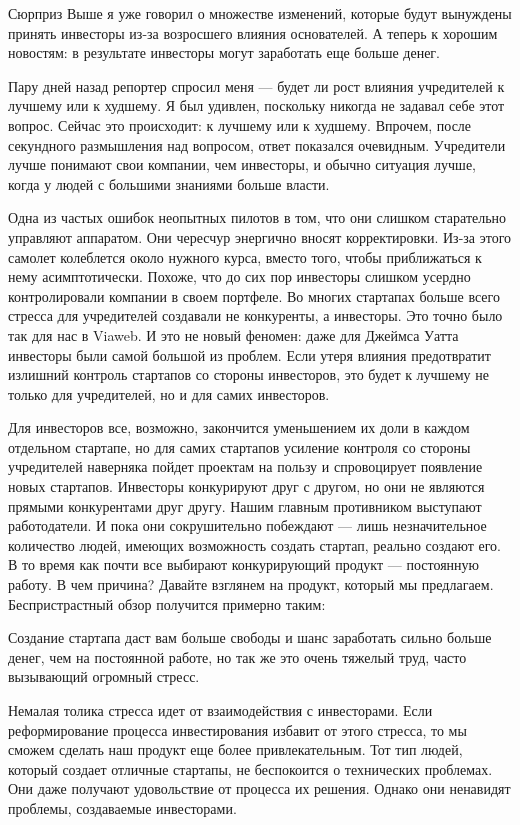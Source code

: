 \documentclass[ebook,12pt,oneside,openany]{memoir}
\begin{document}
Сюрприз Выше я уже говорил о множестве изменений, которые будут
вынуждены принять инвесторы из-за возросшего влияния основателей. А
теперь к хорошим новостям: в результате инвесторы могут заработать еще
больше денег.

Пару дней назад репортер спросил меня — будет ли рост влияния
учредителей к лучшему или к худшему. Я был удивлен, поскольку никогда
не задавал себе этот вопрос. Сейчас это происходит: к лучшему или к
худшему. Впрочем, после секундного размышления над вопросом, ответ
показался очевидным. Учредители лучше понимают свои компании, чем
инвесторы, и обычно ситуация лучше, когда у людей с большими знаниями
больше власти.

Одна из частых ошибок неопытных пилотов в том, что они слишком
старательно управляют аппаратом. Они чересчур энергично вносят
корректировки. Из-за этого самолет колеблется около нужного курса,
вместо того, чтобы приближаться к нему асимптотически. Похоже, что до
сих пор инвесторы слишком усердно контролировали компании в своем
портфеле. Во многих стартапах больше всего стресса для учредителей
создавали не конкуренты, а инвесторы. Это точно было так для нас в
Viaweb. И это не новый феномен: даже для Джеймса Уатта инвесторы были
самой большой из проблем. Если утеря влияния предотвратит излишний
контроль стартапов со стороны инвесторов, это будет к лучшему не
только для учредителей, но и для самих инвесторов.

Для инвесторов все, возможно, закончится уменьшением их доли в каждом
отдельном стартапе, но для самих стартапов усиление контроля со
стороны учредителей наверняка пойдет проектам на пользу и спровоцирует
появление новых стартапов. Инвесторы конкурируют друг с другом, но они
не являются прямыми конкурентами друг другу. Нашим главным противником
выступают работодатели. И пока они сокрушительно побеждают — лишь
незначительное количество людей, имеющих возможность создать стартап,
реально создают его. В то время как почти все выбирают конкурирующий
продукт — постоянную работу. В чем причина? Давайте взглянем на
продукт, который мы предлагаем. Беспристрастный обзор получится
примерно таким:

Создание стартапа даст вам больше свободы и шанс заработать сильно
больше денег, чем на постоянной работе, но так же это очень тяжелый
труд, часто вызывающий огромный стресс.

Немалая толика стресса идет от взаимодействия с инвесторами. Если
реформирование процесса инвестирования избавит от этого стресса, то мы
сможем сделать наш продукт еще более привлекательным. Тот тип людей,
который создает отличные стартапы, не беспокоится о технических
проблемах. Они даже получают удовольствие от процесса их решения.
Однако они ненавидят проблемы, создаваемые инвесторами.
\end{document}
